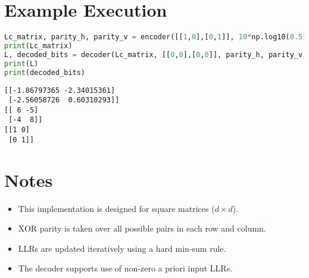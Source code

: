 \documentclass[12pt]{amsart}
\theoremstyle{plain}
\theoremstyle{definition}
\theoremstyle{remark}
\begin{document}
\section{Example Execution}

\begin{lstlisting}[language=Python]
Lc_matrix, parity_h, parity_v = encoder([[1,0],[0,1]], 10*np.log10(0.5))
print(Lc_matrix)
L, decoded_bits = decoder(Lc_matrix, [[0,0],[0,0]], parity_h, parity_v, 2)
print(L)
print(decoded_bits)
\end{lstlisting}
\begin{lstlisting}
[[-1.86797365 -2.34015361]
 [-2.56058726  0.60310293]]
[[ 6 -5]
 [-4  8]]
[[1 0]
 [0 1]]
\end{lstlisting}
\section{Notes}

\begin{itemize}
  \item This implementation is designed for square matrices ($d \times d$).
  \item XOR parity is taken over all possible pairs in each row and column.
  \item LLRs are updated iteratively using a hard min-sum rule.
  \item The decoder supports use of non-zero a priori input LLRs.
\end{itemize}
\end{document}
